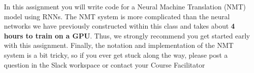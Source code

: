 In this assignment you will write code for a Neural Machine Translation (NMT) model using RNNs. The NMT system is more complicated than the neural networks we have previously constructed within this class and takes about \textbf{4 hours to train on a GPU}. Thus, we strongly recommend you get started early with this assignment. Finally, the notation and implementation of the NMT system is a bit tricky, so if you ever get stuck along the way, please post a question in the Slack workspace or contact your Course Facilitator
